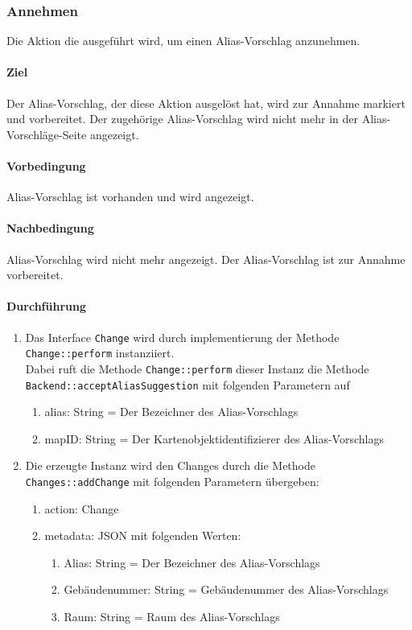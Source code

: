 \subsubsection{\Large Annehmen}

Die Aktion die ausgeführt wird, um einen Alias-Vorschlag anzunehmen.

\paragraph*{Ziel}
Der Alias-Vorschlag, der diese Aktion ausgelöst hat, wird zur Annahme markiert und vorbereitet.
Der zugehörige Alias-Vorschlag wird nicht mehr in der Alias-Vorschläge-Seite angezeigt.

\paragraph*{Vorbedingung}
Alias-Vorschlag ist vorhanden und wird angezeigt.

\paragraph*{Nachbedingung}
Alias-Vorschlag wird nicht mehr angezeigt. Der Alias-Vorschlag ist zur Annahme vorbereitet.

\paragraph*{Durchführung}
\begin{enumerate}
    \item Das Interface \verb#Change# wird durch implementierung der Methode \verb#Change::perform# instanziiert. \\
          Dabei ruft die Methode \verb#Change::perform# dieser Instanz die Methode \verb#Backend::acceptAliasSuggestion# mit folgenden Parametern auf \begin{enumerate}
              \item alias: String = Der Bezeichner des Alias-Vorschlags
              \item mapID: String = Der Kartenobjektidentifizierer des Alias-Vorschlags
          \end{enumerate}
    \item Die erzeugte Instanz wird den Changes durch die Methode \verb#Changes::addChange# mit folgenden Parametern übergeben: \begin{enumerate}
        \item action: Change
        \item metadata: JSON mit folgenden Werten: \begin{enumerate}
            \item Alias: String = Der Bezeichner des Alias-Vorschlags
            \item Gebäudenummer: String = Gebäudenummer des Alias-Vorschlags
            \item Raum: String = Raum des Alias-Vorschlags
        \end{enumerate}
    \end{enumerate}
\end{enumerate}